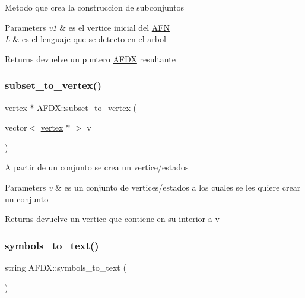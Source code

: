 Metodo que crea la construccion de subconjuntos 
\begin{DoxyParams}{Parameters}
{\em v1} & es el vertice inicial del \hyperlink{class_a_f_n}{A\+FN} \\
\hline
{\em L} & es el lenguaje que se detecto en el arbol \\
\hline
\end{DoxyParams}
\begin{DoxyReturn}{Returns}
devuelve un puntero \hyperlink{class_a_f_d_x}{A\+F\+DX} resultante 
\end{DoxyReturn}
\hypertarget{class_a_f_d_x_a55926260ee08e47aced2343f9672f28f}{}\label{class_a_f_d_x_a55926260ee08e47aced2343f9672f28f} 
\subsubsection{\texorpdfstring{subset\+\_\+to\+\_\+vertex()}{subset\_to\_vertex()}}
{\footnotesize\ttfamily \hyperlink{structvertex}{vertex} $\ast$ A\+F\+D\+X\+::subset\+\_\+to\+\_\+vertex (\begin{DoxyParamCaption}\item[{vector$<$ \hyperlink{structvertex}{vertex} $\ast$ $>$}]{v }\end{DoxyParamCaption})}

A partir de un conjunto se crea un vertice/estados 
\begin{DoxyParams}{Parameters}
{\em v} & es un conjunto de vertices/estados a los cuales se les quiere crear un conjunto \\
\hline
\end{DoxyParams}
\begin{DoxyReturn}{Returns}
devuelve un vertice que contiene en su interior a v 
\end{DoxyReturn}
\hypertarget{class_a_f_d_x_a9b8bedc996a82d6539188d3acb573940}{}\label{class_a_f_d_x_a9b8bedc996a82d6539188d3acb573940} 
\subsubsection{\texorpdfstring{symbols\+\_\+to\+\_\+text()}{symbols\_to\_text()}}
{\footnotesize\ttfamily string A\+F\+D\+X\+::symbols\+\_\+to\+\_\+text (\begin{DoxyParamCaption}{ }\end{DoxyParamCaption})}

